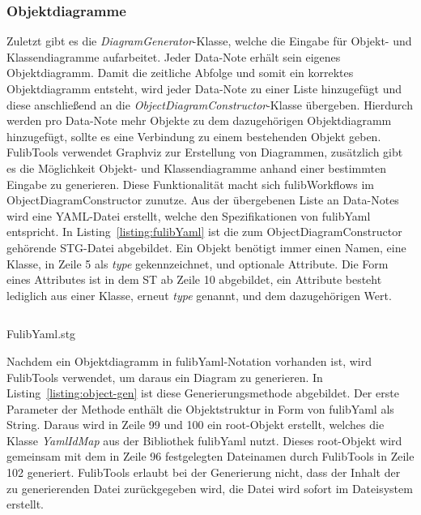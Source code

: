 \subsubsection{Objektdiagramme}\label{subsubsec:objektdiagramme}
Zuletzt gibt es die \textit{DiagramGenerator}-Klasse, welche die Eingabe für Objekt- und Klassendiagramme aufarbeitet.
Jeder Data-Note erhält sein eigenes Objektdiagramm.
Damit die zeitliche Abfolge und somit ein korrektes Objektdiagramm entsteht, wird jeder Data-Note zu einer Liste hinzugefügt und diese anschließend an die
\textit{ObjectDiagramConstructor}-Klasse übergeben.
Hierdurch werden pro Data-Note mehr Objekte zu dem dazugehörigen Objektdiagramm hinzugefügt, sollte es eine Verbindung zu einem bestehenden Objekt geben.
FulibTools verwendet Graphviz zur Erstellung von Diagrammen, zusätzlich gibt es die Möglichkeit Objekt- und Klassendiagramme anhand einer bestimmten Eingabe zu generieren.
Diese Funktionalität macht sich fulibWorkflows im ObjectDiagramConstructor zunutze.
Aus der übergebenen Liste an Data-Notes wird eine YAML-Datei erstellt, welche den Spezifikationen von fulibYaml entspricht.
In Listing~\ref{listing:fulibYaml} ist die zum ObjectDiagramConstructor gehörende \ac{STG}-Datei abgebildet.
Ein Objekt benötigt immer einen Namen, eine Klasse, in Zeile 5 als \textit{type} gekennzeichnet, und optionale Attribute.
Die Form eines Attributes ist in dem \ac{ST} ab Zeile 10 abgebildet, ein Attribute besteht lediglich aus einer Klasse, erneut \textit{type} genannt, und dem
dazugehörigen Wert.

\begin{listing}[!ht]
    \inputminted{c}{listings/3.1.4/FulibYaml.stg}
    \caption{FulibYaml.stg}
    \label{listing:fulibYaml}
\end{listing}


Nachdem ein Objektdiagramm in fulibYaml-Notation vorhanden ist, wird FulibTools verwendet, um daraus ein Diagram zu generieren.
In Listing~\ref{listing:object-gen} ist diese Generierungsmethode abgebildet.
Der erste Parameter der Methode enthält die Objektstruktur in Form von fulibYaml als String.
Daraus wird in Zeile 99 und 100 ein root-Objekt erstellt, welches die Klasse \textit{YamlIdMap} aus der Bibliothek fulibYaml nutzt.
Dieses root-Objekt wird gemeinsam mit dem in Zeile 96 festgelegten Dateinamen durch FulibTools in Zeile 102 generiert.
FulibTools erlaubt bei der Generierung nicht, dass der Inhalt der zu generierenden Datei zurückgegeben wird, die Datei wird sofort im Dateisystem erstellt.

